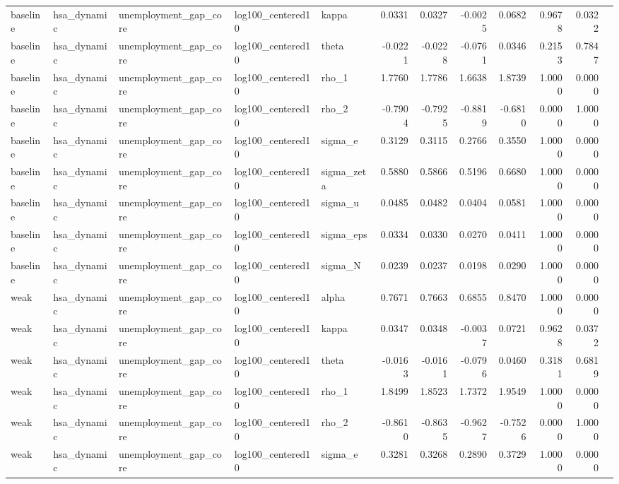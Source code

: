 \begin{tabular}{lllllrrrrrrl}
baseline & hsa\_dynamic & unemployment\_gap\_core & log100\_centered10 & kappa & 0.0331 & 0.0327 & -0.0025 & 0.0682 & 0.9678 & 0.0322 &  \\
baseline & hsa\_dynamic & unemployment\_gap\_core & log100\_centered10 & theta & -0.0221 & -0.0228 & -0.0761 & 0.0346 & 0.2153 & 0.7847 &  \\
baseline & hsa\_dynamic & unemployment\_gap\_core & log100\_centered10 & rho\_1 & 1.7760 & 1.7786 & 1.6638 & 1.8739 & 1.0000 & 0.0000 &  \\
baseline & hsa\_dynamic & unemployment\_gap\_core & log100\_centered10 & rho\_2 & -0.7904 & -0.7925 & -0.8819 & -0.6810 & 0.0000 & 1.0000 &  \\
baseline & hsa\_dynamic & unemployment\_gap\_core & log100\_centered10 & sigma\_e & 0.3129 & 0.3115 & 0.2766 & 0.3550 & 1.0000 & 0.0000 &  \\
baseline & hsa\_dynamic & unemployment\_gap\_core & log100\_centered10 & sigma\_zeta & 0.5880 & 0.5866 & 0.5196 & 0.6680 & 1.0000 & 0.0000 &  \\
baseline & hsa\_dynamic & unemployment\_gap\_core & log100\_centered10 & sigma\_u & 0.0485 & 0.0482 & 0.0404 & 0.0581 & 1.0000 & 0.0000 &  \\
baseline & hsa\_dynamic & unemployment\_gap\_core & log100\_centered10 & sigma\_eps & 0.0334 & 0.0330 & 0.0270 & 0.0411 & 1.0000 & 0.0000 &  \\
baseline & hsa\_dynamic & unemployment\_gap\_core & log100\_centered10 & sigma\_N & 0.0239 & 0.0237 & 0.0198 & 0.0290 & 1.0000 & 0.0000 &  \\
weak & hsa\_dynamic & unemployment\_gap\_core & log100\_centered10 & alpha & 0.7671 & 0.7663 & 0.6855 & 0.8470 & 1.0000 & 0.0000 &  \\
weak & hsa\_dynamic & unemployment\_gap\_core & log100\_centered10 & kappa & 0.0347 & 0.0348 & -0.0037 & 0.0721 & 0.9628 & 0.0372 &  \\
weak & hsa\_dynamic & unemployment\_gap\_core & log100\_centered10 & theta & -0.0163 & -0.0161 & -0.0796 & 0.0460 & 0.3181 & 0.6819 &  \\
weak & hsa\_dynamic & unemployment\_gap\_core & log100\_centered10 & rho\_1 & 1.8499 & 1.8523 & 1.7372 & 1.9549 & 1.0000 & 0.0000 &  \\
weak & hsa\_dynamic & unemployment\_gap\_core & log100\_centered10 & rho\_2 & -0.8610 & -0.8635 & -0.9627 & -0.7526 & 0.0000 & 1.0000 &  \\
weak & hsa\_dynamic & unemployment\_gap\_core & log100\_centered10 & sigma\_e & 0.3281 & 0.3268 & 0.2890 & 0.3729 & 1.0000 & 0.0000 &  \\

\end{tabular}
